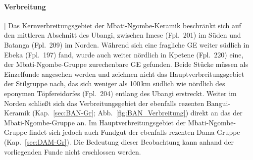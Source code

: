 \paragraph{Verbreitung}\hspace{-.5em}|\hspace{.5em}%
Das Kernverbreitungsgebiet der Mbati-Ngombe-Keramik beschränkt sich auf den mittleren Abschnitt des \mbox{Ubangi}, zwischen Imese (Fpl.~201) im Süden und Batanga (Fpl.~209) im Norden. Während sich eine fragliche GE weiter südlich in Ebeka (Fpl.~197) fand, wurde auch weiter nördlich in Kpetene (Fpl.~220) eine, der Mbati-Ngombe-Gruppe zurechenbare GE gefunden. Beide Stücke  müssen als Einzelfunde angesehen werden und zeichnen nicht das Hauptverbreitungsgebiet der Stilgruppe nach, das sich weniger als 100\,km südlich wie nördlich des eponymen Töpfereidorfes (Fpl.~204) entlang des \mbox{Ubangi} erstreckt. Weiter im Norden schließt sich das Verbreitungsgebiet der ebenfalls rezenten Bangui-Keramik (Kap.~\ref{sec:BAN-Gr}; Abb.~\ref{fig:BAN_Verbreitung}) direkt an das der Mbati-Ngombe-Gruppe an. Im Hauptverbreitungsgebiet der Mbati-Ngombe-Gruppe findet sich jedoch auch Fundgut der ebenfalls rezenten Dama-Gruppe (Kap.~\ref{sec:DAM-Gr}). Die Bedeutung dieser Beobachtung kann anhand der vorliegenden Funde nicht erschlossen werden.
